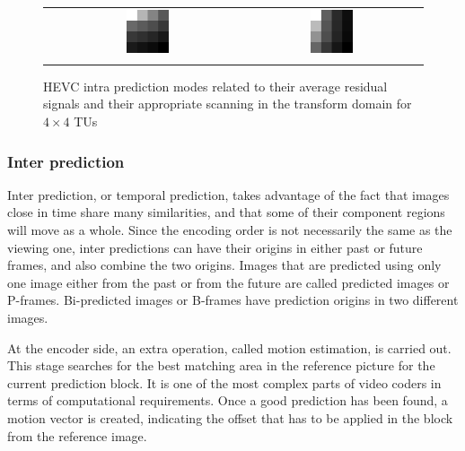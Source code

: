 \documentclass[11pt,a4paper,openright,twoside]{book}
\numberwithin{equation}{section} %
\numberwithin{figure}{section} %
\numberwithin{table}{section} %
\begin{document}
\begin{figure}[tb]
\begin{minipage}{0.48\textwidth}
\begin{tabular}[H]{ccc}
			&
			\includegraphics[width=0.25\textwidth]{figures/coeffs-scan-horz.png}
			&
			\includegraphics[width=0.25\textwidth]{figures/coeffs-scan-vert.png}
			\\
			\color{red}{diagonal} & \color{mygreen}{horizontal} & \color{blue}{vertical} \\
		\end{tabular}
	\end{minipage}
	\caption{\acs{HEVC} intra prediction modes related to their average
	residual signals and their appropriate scanning in the transform
	domain for $4\times4$ \acsp{TU}}
	\label{fig:mdcs}
\end{figure}


\subsubsection{Inter prediction}
\label{ssub:inter_prediction}

Inter prediction, or temporal prediction, takes advantage of the fact that
images close in time share many similarities, and that some of their component
regions will move as a whole.
Since the encoding order is not necessarily the same as the viewing one, inter
predictions can have their origins in either past or future frames, and also
combine the two origins.
Images that are predicted using only one image either from the past or from
the future are called predicted images or P-frames.
Bi-predicted images or B-frames have prediction origins in two different
images.

At the encoder side, an extra operation, called motion estimation, is
carried out.
This stage searches for the best matching area in the reference picture
for the current prediction block.
It is one of the most complex parts of video coders in terms of computational
requirements.
Once a good prediction has been found, a motion vector is created, indicating
the offset that has to be applied in the block from the reference image.
\end{document}
